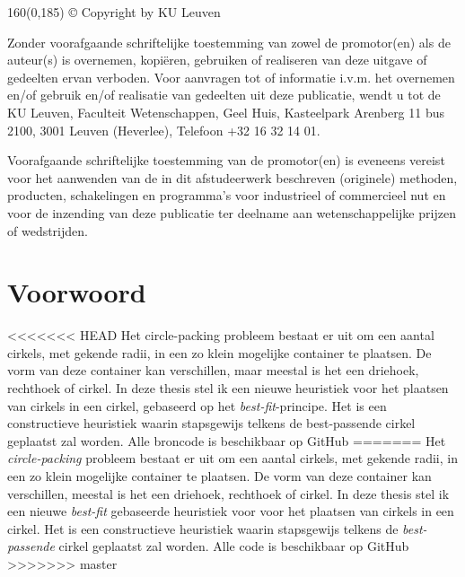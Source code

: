 \documentclass[12pt,a4paper,oneside]{book}
\begin{document}
\newpage
\thispagestyle{empty}
\begin{textblock}{160}(0,185)
© Copyright by KU Leuven

Zonder voorafgaande schriftelijke toestemming van zowel de promotor(en) als de auteur(s) is overnemen, kopiëren, gebruiken of realiseren van deze uitgave of gedeelten ervan verboden. Voor aanvragen tot of informatie i.v.m. het overnemen en/of gebruik en/of realisatie van gedeelten uit deze publicatie, wendt u tot de KU Leuven, Faculteit Wetenschappen, Geel Huis, Kasteelpark Arenberg 11 bus 2100, 3001 Leuven (Heverlee), Telefoon +32 16 32 14 01.

Voorafgaande schriftelijke toestemming van de promotor(en) is eveneens vereist voor het aanwenden van de in dit afstudeerwerk beschreven (originele) methoden, producten, schakelingen en programma’s voor industrieel of commercieel nut en voor de inzending van deze publicatie ter deelname aan wetenschappelijke prijzen of wedstrijden.
\end{textblock}

\newpage

\rmfamily
\setcounter{page}{0}

\newpage

\chapter*{Voorwoord}

<<<<<<< HEAD
Het circle-packing probleem bestaat er uit om een aantal cirkels, met gekende radii, in een zo klein mogelijke container te plaatsen.
De vorm van deze container kan verschillen, maar meestal is het een driehoek, rechthoek of cirkel.
In deze thesis stel ik een nieuwe heuristiek voor het plaatsen van cirkels in een cirkel, gebaseerd op het \textit{best-fit}-principe.
Het is een constructieve heuristiek waarin stapsgewijs telkens de best-passende cirkel geplaatst zal worden.
Alle broncode is beschikbaar op GitHub \cite{circle-packing-github}
=======
Het \textit{circle-packing} probleem bestaat er uit om een aantal cirkels, met gekende radii, in een zo klein mogelijke container te plaatsen.
De vorm van deze container kan verschillen, meestal is het een driehoek, rechthoek of cirkel.
In deze thesis stel ik een nieuwe \textit{best-fit} gebaseerde heuristiek voor voor het plaatsen van cirkels in een cirkel.
Het is een constructieve heuristiek waarin stapsgewijs telkens de \textit{best-passende} cirkel geplaatst zal worden.
Alle code is beschikbaar op GitHub \cite{circle-packing-github}
>>>>>>> master
\end{document}
